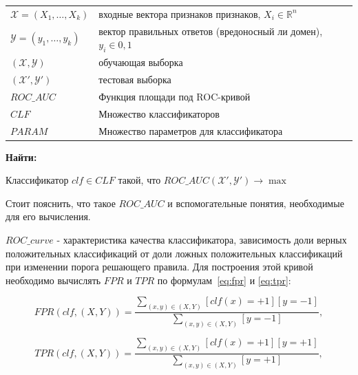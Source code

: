 \documentclass[a4paper,14pt]{extreport} %
\begin{document}
\begin{tabular}{p{6cm} p{7.5cm}}
	$\mathcal{X}=(X_1,\ldots,X_k)$ & входные вектора признаков признаков, $X_i\in\mathbb{R}^n$                \\[0.1cm]
	$\mathcal{Y}=(y_1,\ldots,y_k)$ & вектор правильных ответов (вредоносный ли домен), $y_i\in{0,1}$ \\[0.1cm]
	$(\mathcal{X},\mathcal{Y})$    & обучающая выборка                                                                        \\[0.1cm]
	$(\mathcal{X'},\mathcal{Y'})$  & тестовая выборка                                                                          \\[0.1cm]
	$ROC\_AUC$                     & Функция площади под ROC-кривой                                                    \\[0.1cm]
	$CLF$                          & Множество классификаторов                                                        \\[0.1cm]
	$PARAM$                        & Множество параметров для классификатора                              \\[0.1cm]
		
\end{tabular}
	 
{\bf
	Найти:
	} 

Классификатор $clf \in CLF$ такой, что $ROC\_AUC(\mathcal{X'},\mathcal{Y'}) \rightarrow \max$ 
\newline
	
Стоит пояснить, что такое $ROC\_AUC$ и вспомогательные понятия, необходимые для его вычисления. 
	
$ROC\_curve$ - характеристика качества классификатора, зависимость доли верных положительных классификаций от доли ложных положительных классификаций при изменении порога решающего правила. Для построения этой кривой необходимо вычислять $FPR$ и $TPR$ по формулам~\eqref{eq:fpr} и \eqref{eq:tpr}:
	
\begin{equation}
\label{eq:fpr}
FPR(clf, (X, Y)) = \frac{\sum_{(x, y) \in (X, Y)}[clf(x)=+1][y=-1]}{\sum_{(x, y) \in (X, Y)}[y=-1]},
\end{equation}
	
\begin{equation}
\label{eq:tpr}
TPR(clf, (X, Y)) = \frac{\sum_{(x, y) \in (X, Y)}[clf(x)=+1][y=+1]}{\sum_{(x, y) \in (X, Y)}[y=+1]},
\end{equation}
	
\end{document}
